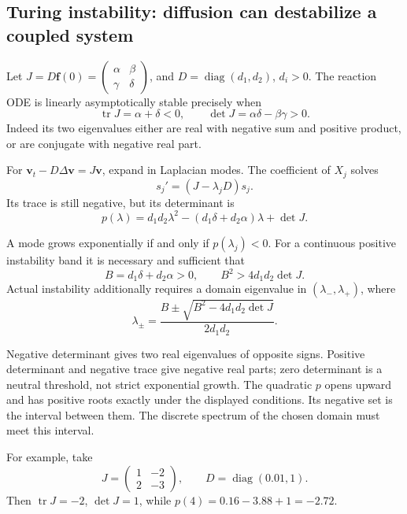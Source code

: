 \Needspace{35mm}
\subsection{Turing instability: diffusion can destabilize a coupled system}
Let $J=D\mathbf f(0)=\left(\begin{smallmatrix}\alpha&\beta\\
\gamma&\delta\end{smallmatrix}\right)$, and
$D=\operatorname{diag}(d_1,d_2)$, $d_i>0$.
The reaction ODE is linearly asymptotically stable precisely when
\[
 \operatorname{tr}J=\alpha+\delta<0,\qquad
 \det J=\alpha\delta-\beta\gamma>0 .
\]
Indeed its two eigenvalues either are real with negative sum and
positive product, or are conjugate with negative real part.

For $\mathbf v_t-D\Delta\mathbf v=J\mathbf v$, expand in Laplacian modes.
The coefficient of $X_j$ solves
\[
 s_j'=(J-\lambda_jD)s_j .
\]
Its trace is still negative, but its determinant is
\[
 p(\lambda)=d_1d_2\lambda^2-(d_1\delta+d_2\alpha)\lambda+\det J .
\]
\begin{theorem}
A mode grows exponentially if and only if $p(\lambda_j)<0$.
For a continuous positive instability band it is necessary and sufficient that
\[
 B=d_1\delta+d_2\alpha>0,\qquad B^2>4d_1d_2\det J .
\]
Actual instability additionally requires a domain eigenvalue in
$(\lambda_-,\lambda_+)$, where
\[
 \lambda_\pm=\frac{B\pm\sqrt{B^2-4d_1d_2\det J}}{2d_1d_2}.
\]
\end{theorem}
\begin{expandedproof}
Negative determinant gives two real eigenvalues of opposite signs.
Positive determinant and negative trace give negative real parts;
zero determinant is a neutral threshold, not strict exponential growth.
The quadratic $p$ opens upward and has positive roots exactly under
the displayed conditions. Its negative set is the interval between them.
The discrete spectrum of the chosen domain must meet this interval.
\end{expandedproof}
\Needspace{45mm}
For example, take
\[
 J=\begin{pmatrix}1&-2\\2&-3\end{pmatrix},\qquad
 D=\operatorname{diag}(0.01,1).
\]
Then $\operatorname{tr}J=-2$, $\det J=1$, while
$p(4)=0.16-3.88+1=-2.72$.
